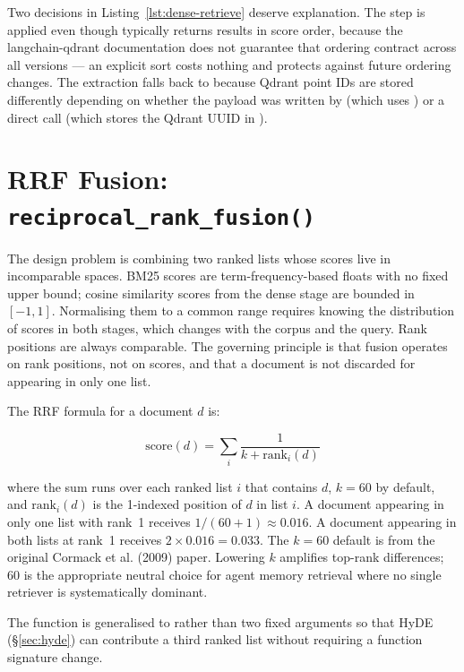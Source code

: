 Two decisions in Listing~\ref{lst:dense-retrieve} deserve explanation.
The  step is applied even though
 typically returns results in score
order, because the langchain-qdrant documentation does not guarantee that
ordering contract across all versions --- an explicit sort costs nothing and
protects against future ordering changes. The  extraction
falls back to  because Qdrant point IDs are stored differently
depending on whether the payload was written by  (which uses
) or a direct  call (which stores the Qdrant UUID in
).


\section{RRF Fusion: \texttt{reciprocal\_rank\_fusion()}}
\label{sec:rrf-fusion}

The design problem is combining two ranked lists whose scores live in
incomparable spaces. BM25 scores are term-frequency-based floats with no
fixed upper bound; cosine similarity scores from the dense stage are bounded
in $[-1, 1]$. Normalising them to a common range requires knowing the
distribution of scores in both stages, which changes with the corpus and
the query. Rank positions are always comparable. The governing principle is
that fusion operates on rank positions, not on scores, and that a document
is not discarded for appearing in only one list.

The RRF formula for a document $d$ is:

\[ \text{score}(d) = \sum_{i} \frac{1}{k + \text{rank}_i(d)} \]

where the sum runs over each ranked list $i$ that contains $d$, $k = 60$
by default, and $\text{rank}_i(d)$ is the 1-indexed position of $d$ in
list $i$. A document appearing in only one list with rank~1 receives
$1 / (60 + 1) \approx 0.016$. A document appearing in both lists at rank~1
receives $2 \times 0.016 = 0.033$. The $k = 60$ default is from the
original Cormack et al. (2009) paper. Lowering $k$ amplifies top-rank
differences; 60 is the appropriate neutral choice for agent memory retrieval
where no single retriever is systematically dominant.

The function is generalised to  rather
than two fixed arguments so that HyDE (\S\ref{sec:hyde}) can contribute a
third ranked list without requiring a function signature change.

